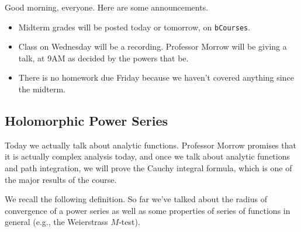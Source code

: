 
Good morning, everyone. Here are some announcements.
\begin{itemize}
	\item Midterm grades will be posted today or tomorrow, on \texttt{bCourses}.
	\item Class on Wednesday will be a recording. Professor Morrow will be giving a talk, at 9AM as decided by the powers that be.
	\item There is no homework due Friday because we haven't covered anything since the midterm.
\end{itemize}

\subsection{Holomorphic Power Series}
Today we actually talk about analytic functions. Professor Morrow promises that it is actually complex analysis today, and once we talk about analytic functions and path integration, we will prove the Cauchy integral formula, which is one of the major results of the course.

We recall the following definition.
\powerseriesdefi*
\noindent So far we've talked about the radius of convergence of a power series as well as some properties of series of functions in general (e.g., the Weierstrass $M$-test).

